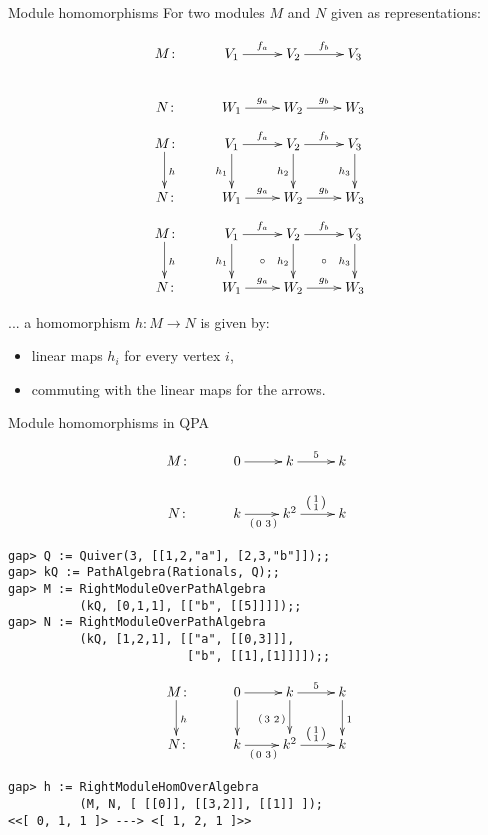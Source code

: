 
\begin{frame}{Module homomorphisms}
For two modules $M$ and $N$ given as representations:
\begin{overprint}
\[
\xymatrix{
M \colon &
V_1 \ar[r]^{f_a} &
V_2 \ar[r]^{f_b} &
V_3
\\
N \colon &
W_1 \ar[r]^{g_a} &
W_2 \ar[r]^{g_b} &
W_3
}
\]
\[
\xymatrix{
M \colon \ar@<-.2em>[d]^{h} &
V_1 \ar[r]^{f_a} \ar[d]_{h_1} &
V_2 \ar[r]^{f_b} \ar[d]_{h_2} &
V_3              \ar[d]_{h_3}
\\
N \colon &
W_1 \ar[r]^{g_a} &
W_2 \ar[r]^{g_b} &
W_3
}
\]
\[
\xymatrix{
M \colon \ar@<-.2em>[d]^{h} &
V_1 \ar[r]^{f_a} \ar[d]_{h_1} \ar@{}[dr]|{\circ} &
V_2 \ar[r]^{f_b} \ar[d]_{h_2} \ar@{}[dr]|{\circ} &
V_3              \ar[d]_{h_3}
\\
N \colon &
W_1 \ar[r]^{g_a} &
W_2 \ar[r]^{g_b} &
W_3
}
\]
\end{overprint}
\vspace{1em}

... a homomorphism $h \colon M \to N$ is given by:
\begin{itemize}
\item linear maps $h_i$ for every vertex $i$,
\item commuting with the linear maps for the arrows.
\end{itemize}
\end{frame}

\begin{frame}[fragile]{Module homomorphisms in QPA}
\begin{overprint}
\[
\xymatrix{
M \colon &
0 \ar[r]     &
k \ar[r]^{5} &
k \ar@{}[d]^{\phantom{1}}
\\
N \colon &
k   \ar[r]_{\vv{0}{3}} &
k^2 \ar[r]^{\left( \begin{smallmatrix} 1 \\ 1 \end{smallmatrix} \right)} &
k
}
\]
\begin{verbatim}
gap> Q := Quiver(3, [[1,2,"a"], [2,3,"b"]]);;
gap> kQ := PathAlgebra(Rationals, Q);;
gap> M := RightModuleOverPathAlgebra
          (kQ, [0,1,1], [["b", [[5]]]]);;
gap> N := RightModuleOverPathAlgebra
          (kQ, [1,2,1], [["a", [[0,3]]],
                         ["b", [[1],[1]]]]);;
\end{verbatim}
\[
\xymatrix{
M \colon \ar@<-.2em>[d]^{h} &
0 \ar[r]     \ar[d] &
k \ar[r]^{5} \ar[d]_{\vv{3}{2}} &
k            \ar[d]^{1}
\\
N \colon &
k   \ar[r]_{\vv{0}{3}} &
k^2 \ar[r]^{\left( \begin{smallmatrix} 1 \\ 1 \end{smallmatrix} \right)} &
k
}
\]
\begin{verbatim}
gap> h := RightModuleHomOverAlgebra
          (M, N, [ [[0]], [[3,2]], [[1]] ]);
<<[ 0, 1, 1 ]> ---> <[ 1, 2, 1 ]>>
\end{verbatim}
\end{overprint}
\end{frame}


